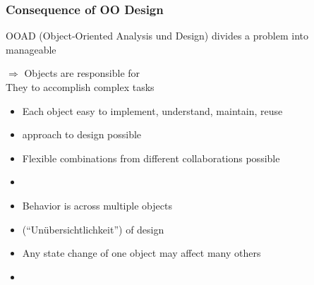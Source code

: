 \subsubsection{Consequence of OO Design}
\begin{defBox}
    OOAD (Object-Oriented Analysis und Design) divides a problem into manageable 
\end{defBox}
\begin{defBox}
    $\Rightarrow$ Objects are responsible for \\
    They  to accomplish complex tasks
\end{defBox}
\begin{itemize}
    \item Each object easy to implement, understand, maintain, reuse
    \item {} approach to design possible
    \item Flexible combinations from different collaborations possible
    \item {}
\end{itemize}
\begin{itemize}
    \item Behavior is  across multiple objects
    \item {}(\enquote{Unübersichtlichkeit}) of  design
    \item Any state change of one object may affect many others
    \item {}
\end{itemize}
